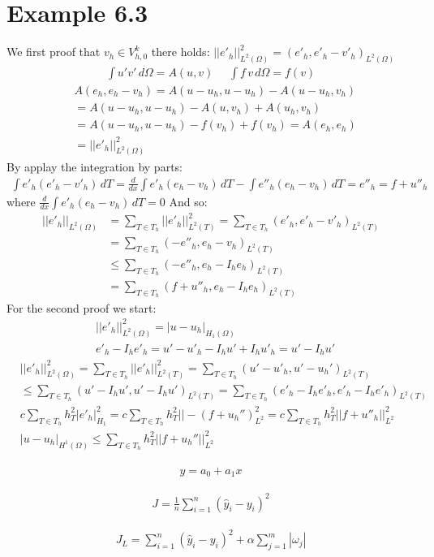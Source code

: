 \documentclass[11pt,a4paper]{article}
\begin{document}
\section{Example 6.3}
We first proof that $v_h \in V^k_{h,0}$ there holds: $||e'_h||^2_{L^2(\Omega)} = (e'_h,e'_h-v'_h)_{L^2(\Omega)}$
\begin{align*}
\int u'v'\,d\Omega = A(u,v) \,\,\,\,\,\,\,\, \int f\,v\,d\Omega = f(v)
\end{align*}
\begin{align*}
& A(e_h,e_h-v_h) = A(u-u_h,u-u_h)-A(u-u_h,v_h)\\
& = A(u-u_h,u-u_h)-A(u,v_h)+A(u_h,v_h)\\
& = A(u-u_h,u-u_h)-f(v_h)+f(v_h) = A(e_h,e_h) \\
& = ||e'_h||^2_{L^2(\Omega)}
\end{align*}
By applay the integration by parts:
\begin{align*}
\int e'_h(e'_h-v'_h)\,dT = \frac{d}{dx}\int e'_h(e_h-v_h)\,dT-\int e''_h(e_h-v_h)\,dT
=e''_h = f + u''_h
\end{align*}
where $\frac{d}{dx}\int e'_h(e_h-v_h)\,dT = 0$
And so:
\begin{align*}
||e'_h||_{L^2(\Omega)} & = \sum_{T \in T_h}||e'_h||^2_{L^2(T)} = \sum_{T \in T_h}(e'_h,e'_h-v'_h)_{L^2(T)}\\
& = \sum_{T \in T_h} (-e''_h,e_h-v_h)_{L^2(T)}\\
& \leq \sum_{T \in T_h}(-e''_h,e_h-I_he_h)_{L^2(T)}\\
& = \sum_{T \in T_h}(f+u''_h,e_h-I_he_h)_{L^2(T)}
\end{align*}
For the second proof we start:
\begin{align*}
&||e'_h||^2_{L^2(\Omega)} = |u-u_h|_{H_1(\Omega)}\\
& e'_h-I_he'_h = u'-u'_h-I_hu'+I_hu'_h = u'-I_hu'
\end{align*}
\begin{align*}
& ||e'_h||^2_{L^2(\Omega)} = \sum_{T \in T_h}||e'_h||^2_{L^2(T)} = \sum_{T \in T_h}(u'-u'_h,u'-u_h')_{L^2(T)}\\
& \leq \sum_{T \in T_h}(u'-I_hu',u'-I_hu')_{L^2(T)} = \sum_{T \in T_h}(e'_h-I_he'_h,e'_h-I_he'_h)_{L^2(T)}\\
& c \sum_{T \in T_h} h_T^2|e'_h|^2_{H_1} = c \sum_{T \in T_h} h_T^2||-(f+u_h'')^2_{L^2} = c \sum_{T \in T_h}h_T^2||f+u''_h||^2_{L^2}\\
& |u-u_h|_{H^1(\Omega)} \leq \sum_{T \in T_h} h_T^2||f+u_h''||^2_{L^2}
\end{align*}


\begin{align*}
y = a_0+a_1x
\end{align*}

\begin{align*}
J = \frac{1}{n}\sum_{i = 1}^n(\hat{y}_i-y_i)^2
\end{align*}

\begin{align*}
J_L = \sum_{i = 1}^n(\hat{y}_i-y_i)^2+\alpha \sum_{j = 1}^m|\omega_j|
\end{align*}
\end{document}
